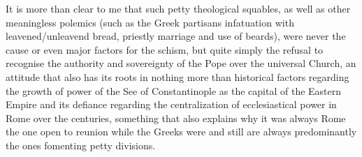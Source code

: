 \begin{footnotesize}
\begin{sffamily}
It is more than clear to me that such petty theological squables, as well as other meaningless polemics (such as the Greek partisans infatuation with leavened/unleavend bread, priestly marriage and use of beards), were never the cause or even major factors for the schism, but quite simply the refusal to recognise the authority and sovereignty of the Pope over the universal Church, an attitude that also has its roots in nothing more than historical factors regarding the growth of power of the See of Constantinople as the capital of the Eastern Empire and its defiance regarding the centralization of ecclesiastical power in Rome over the centuries, something that also explains why it was always Rome the one open to reunion while the Greeks were and still are always predominantly the ones fomenting petty divisions.


\end{sffamily}\end{footnotesize}
